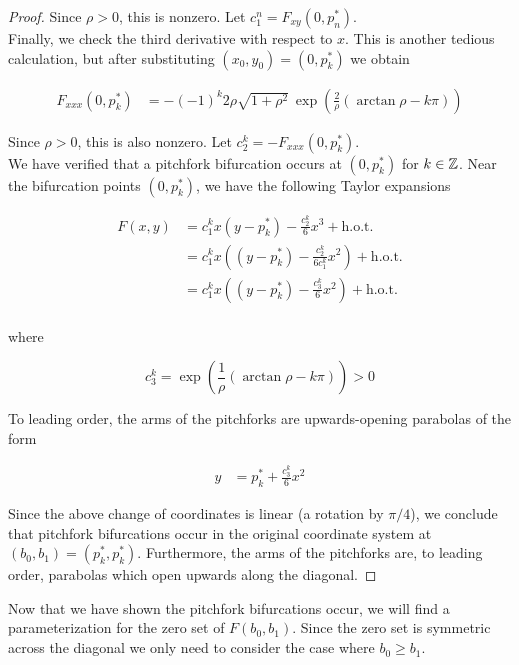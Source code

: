 \documentclass[thesis.tex]{subfiles}
\begin{document}
\begin{lemma}
\begin{proof}
Since $\rho > 0$, this is nonzero. Let $c_1^n = F_{xy}(0, p^*_n)$. \\

Finally, we check the third derivative with respect to $x$. This is another tedious calculation, but after substituting $(x_0, y_0) = \left(0, p^*_k \right)$ we obtain

\begin{align*}
F_{xxx}(0, p_k^*)
&= -(-1)^k 2 \rho \sqrt{1 + \rho^2} \: \exp{\left(\frac{2}{\rho} (\arctan \rho - k \pi) \right)}
\end{align*}

Since $\rho > 0$, this is also nonzero. Let $c_2^k = -F_{xxx}(0, p^*_k)$. \\

We have verified that a pitchfork bifurcation occurs at $(0, p^*_k)$ for $k \in {\mathbb Z}$. Near the bifurcation points $(0, p_k^*)$, we have the following Taylor expansions

\begin{align*}
F(x, y) &= c_1^k x (y - p_k^*) - \frac{c_2^k}{6} x^3 + \text{h.o.t.} \\
&= c_1^k x \left( (y - p_k^*) - \frac{c_2^k}{6 c_1^k } x^2 \right) + \text{h.o.t.} \\
&= c_1^k x \left( (y - p_k^*) - \frac{c_3^k}{6} x^2 \right) + \text{h.o.t.} \\
\end{align*}

where

\begin{equation*}
c_3^k = \exp{\left(\frac{1}{\rho} (\arctan \rho - k \pi) \right)} > 0
\end{equation*}

To leading order, the arms of the pitchforks are upwards-opening parabolas of the form 

\begin{align*}
y &= p_k^* + \frac{c_3^k}{6} x^2
\end{align*}

Since the above change of coordinates is linear (a rotation by $\pi/4$), we conclude that pitchfork bifurcations occur in the original coordinate system at $(b_0, b_1) = (p_k^*, p_k^*)$. Furthermore, the arms of the pitchforks are, to leading order, parabolas which open upwards along the diagonal.

\end{proof}
\end{lemma}

Now that we have shown the pitchfork bifurcations occur, we will find a parameterization for the zero set of $F(b_0, b_1)$. Since the zero set is symmetric across the diagonal we only need to consider the case where $b_0 \geq b_1$.\\
\end{document}
